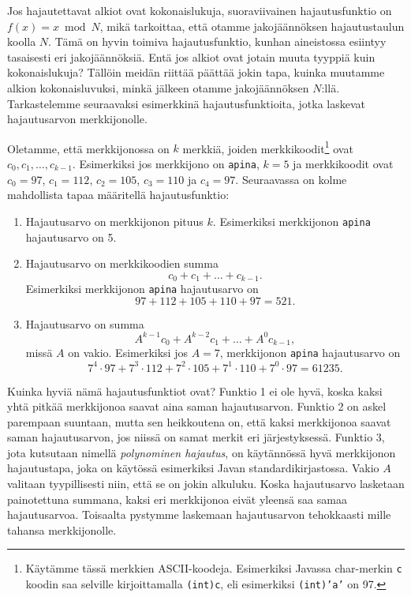 Jos hajautettavat alkiot ovat kokonaislukuja,
suoraviivainen hajautusfunktio on $f(x)=x \bmod N$,
mikä tarkoittaa, että otamme jakojäännöksen hajautustaulun koolla $N$.
Tämä on hyvin toimiva hajautusfunktio,
kunhan aineistossa esiintyy tasaisesti eri jakojäännöksiä.
Entä jos alkiot ovat jotain muuta tyyppiä kuin kokonaislukuja?
Tällöin meidän riittää päättää jokin tapa,
kuinka muutamme alkion kokonaisluvuksi,
minkä jälkeen otamme jakojäännöksen $N$:llä.
Tarkastelemme seuraavaksi esimerkkinä hajautusfunktioita,
jotka laskevat hajautusarvon merkkijonolle.

Oletamme, että merkkijonossa on $k$ merkkiä,
joiden merkkikoodit\footnote{Käytämme tässä merkkien ASCII-koodeja.
Esimerkiksi Javassa char-merkin \texttt{c} koodin saa
selville kirjoittamalla \texttt{(int)c}, eli esimerkiksi
\texttt{(int)'a'} on 97.} ovat $c_0,c_1,\dots,c_{k-1}$.
Esimerkiksi jos merkkijono on \texttt{apina},
$k=5$ ja merkkikoodit ovat $c_0=97$, $c_1=112$, $c_2=105$,
$c_3=110$ ja $c_4=97$.
Seuraavassa on kolme mahdollista tapaa määritellä hajautusfunktio:

\begin{enumerate}
\item Hajautusarvo on merkkijonon pituus $k$.
Esimerkiksi merkkijonon \texttt{apina} hajautusarvo on 5.
\item Hajautusarvo on merkkikoodien summa
\[ c_0 + c_1 + \dots + c_{k-1}.\]
Esimerkiksi merkkijonon \texttt{apina} hajautusarvo on
\[97+112+105+110+97=521.\]
\item Hajautusarvo on summa
\[ A^{k-1} c_0 + A^{k-2} c_1 + \dots + A^0 c_{k-1},\]
missä $A$ on vakio.
Esimerkiksi jos $A=7$, merkkijonon \texttt{apina} hajautusarvo on
\[7^4 \cdot 97+7^3 \cdot 112+7^2 \cdot 105+7^1 \cdot 110+7^0 \cdot 97=61235.\]
\end{enumerate}

Kuinka hyviä nämä hajautusfunktiot ovat?
Funktio 1 ei ole hyvä, koska kaksi yhtä pitkää
merkkijonoa saavat aina saman hajautusarvon.
Funktio 2 on askel parempaan suuntaan,
mutta sen heikkoutena on, että kaksi merkkijonoa
saavat saman hajautusarvon, jos niissä on
samat merkit eri järjestyksessä.
Funktio 3, jota kutsutaan nimellä \emph{polynominen hajautus},
on käytännössä hyvä merkkijonon hajautustapa, joka on käytössä esimerkiksi
Javan standardikirjastossa.
Vakio $A$ valitaan tyypillisesti niin, että se on jokin alkuluku.
Koska hajautusarvo lasketaan painotettuna summana,
kaksi eri merkkijonoa eivät yleensä saa samaa hajautusarvoa.
Toisaalta pystymme laskemaan hajautusarvon tehokkaasti
mille tahansa merkkijonolle.

